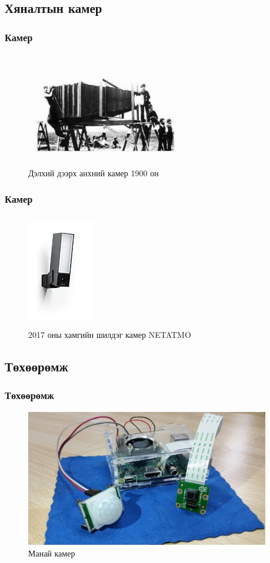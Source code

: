 \subsection{Хяналтын камер} 
\begin{frame}
\frametitle{Камер}
	\begin{figure}[htp]
	\centering
	\includegraphics[width=7cm,height=5cm ]{figures/first.jpg}
	\caption{ Дэлхий дээрх анхний камер 1900 он}
	\label{fig:lion}
	\end{figure}
	
	
\end{frame}
\begin{frame}
\frametitle{Камер}
	\begin{figure}[htp]
	\centering
	\includegraphics[width=3cm,height=5cm ]{figures/last.jpeg}
	\caption{ 2017 оны хамгийн шилдэг камер NETATMO}
	\label{fig:lion}
	\end{figure}
	
	
\end{frame}





\subsection{Төхөөрөмж} 
\begin{frame}
\frametitle{Төхөөрөмж}
	\begin{figure}[htp]
	\centering
	\includegraphics[width=\textwidth,height=6cm ]{figures/mycam.jpg}
	\caption{ Манай камер}
	\label{fig:lion}
	\end{figure}
 \end{frame}
 
